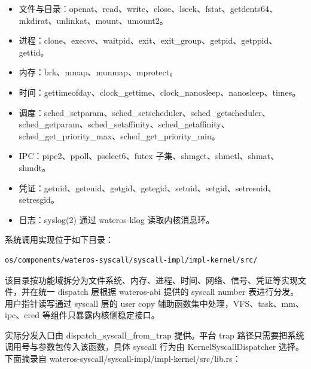 \documentclass[12pt,openany,oneside,AutoFakeBold=true]{ctexbook}
\newcommand{\code}[1]{\textnormal{\rmfamily #1}}
\newcommand{\syscall}[1]{\textnormal{\rmfamily #1}}
\begin{document}
\begin{itemize}
  \item 文件与目录：\syscall{openat}、\syscall{read}、\syscall{write}、\syscall{close}、\syscall{lseek}、\syscall{fstat}、\syscall{getdents64}、\syscall{mkdirat}、\syscall{unlinkat}、\syscall{mount}、\syscall{umount2}。
  \item 进程：\syscall{clone}、\syscall{execve}、\syscall{waitpid}、\syscall{exit}、\syscall{exit\_group}、\syscall{getpid}、\syscall{getppid}、\syscall{gettid}。
  \item 内存：\syscall{brk}、\syscall{mmap}、\syscall{munmap}、\syscall{mprotect}。
  \item 时间：\syscall{gettimeofday}、\syscall{clock\_gettime}、\syscall{clock\_nanosleep}、\syscall{nanosleep}、\syscall{times}。
  \item 调度：\syscall{sched\_setparam}、\syscall{sched\_setscheduler}、\syscall{sched\_getscheduler}、\syscall{sched\_getparam}、\syscall{sched\_setaffinity}、\syscall{sched\_getaffinity}、\syscall{sched\_get\_priority\_max}、\syscall{sched\_get\_priority\_min}。
  \item IPC：\syscall{pipe2}、\syscall{ppoll}、\syscall{pselect6}、\syscall{futex} 子集、\syscall{shmget}、\syscall{shmctl}、\syscall{shmat}、\syscall{shmdt}。
  \item 凭证：\syscall{getuid}、\syscall{geteuid}、\syscall{getgid}、\syscall{getegid}、\syscall{setuid}、\syscall{setgid}、\syscall{setresuid}、\syscall{setresgid}。
  \item 日志：\syscall{syslog(2)} 通过 \code{wateros-klog} 读取内核消息环。
\end{itemize}

系统调用实现位于如下目录：

\begin{lstlisting}
os/components/wateros-syscall/syscall-impl/impl-kernel/src/
\end{lstlisting}

该目录按功能域拆分为文件系统、内存、进程、时间、网络、信号、凭证等实现文件，并在统一 dispatch 层根据 \code{wateros-abi} 提供的 syscall number 表进行分发。用户指针读写通过 syscall 层的 user copy 辅助函数集中处理，VFS、task、mm、ipc、cred 等组件只暴露内核侧稳定接口。

实际分发入口由 \code{dispatch\_syscall\_from\_trap} 提供。平台 trap 路径只需要把系统调用号与参数包传入该函数，具体 syscall 行为由 \code{KernelSyscallDispatcher} 选择。下面摘录自 \code{wateros-syscall/syscall-impl/impl-kernel/src/lib.rs}：
\end{document}
